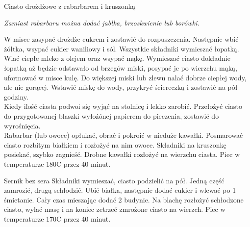 \documentclass[a4paper,12pt]{article}
\begin{document}
\begin{recipe}{Ciasto drożdżowe z rabarbarem i kruszonką}{}{}
\freeform%
\begin{center}
    \textit{Zamiast rabarbaru można dodać jabłka, brzoskwienie lub borówki.}
\end{center}
W misce zasypać drożdże cukrem i zostawić do rozpuszczenia.
Następnie wbić żółtka, wsypać cukier waniliowy i sól.
Wszystkie składniki wymieszać łopatką.
Wlać ciepłe mleko z olejem oraz wsypać mąkę.
Wymieszać ciasto dokładnie łopatką aż będzie odstawało od brzegów miski, posypać je po wierzchu mąką, uformować w misce kulę.
\freeform{}%
Do większej miski lub zlewu nalać dobrze ciepłej wody, ale nie gorącej. Wstawić miskę do wody, przykryć ściereczką i zostawić na pół godziny. \\

Kiedy ilość ciasta podwoi się wyjąć na stolnicę i lekko zarobić. Przełożyć ciasto do przygotowanej blaszki wyłożónej papierem do pieczenia, zostawić do wyrośnięcia. \\

Rabarbar (lub owoce) opłukać, obrać i pokroić w nieduże kawałki. Posmarować ciasto rozbitym białkiem i rozłożyć na nim owoce. 
Składniki na kruszonkę posiekać, szybko zagnieść. Drobne kawałki rozłożyć na wierzchu ciasta. Piec w temperaturze 180\0C przez 40 minut.
\end{recipe}

\begin{recipe}{Sernik bez sera}{}{}
\freeform{}%
Składniki wymieszać, ciasto podzielić na pół. Jedną część zamrozić, drugą schłodzić. 
Ubić białka, następnie dodać cukier i wlewać po 1 śmietanie. Cały czas mieszając dodać 2 budynie.
Na blachę rozłożyć schłodzone ciasto, wylać masę i na koniec zetrzeć zmrożone ciasto na wierzch.
Piec w temperaturze 170\0C przez 40 minut.
\end{recipe}
\end{document}
